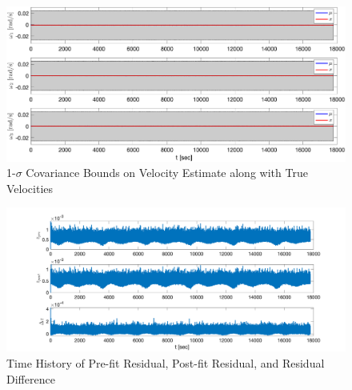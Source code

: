 \begin{figure}[H]
    \centering
    \captionsetup{ justification = centering}
    \includegraphics[width=12cm]{Images/PS10/mult_ext_kalman_filter_omega_cov_bounds.png}
    \caption{1-$\sigma$ Covariance Bounds on Velocity Estimate along with True Velocities}
    \label{fig:velocity_error_bounds}
\end{figure}

\begin{figure}[H]
    \centering
    \captionsetup{ justification = centering}
    \includegraphics[width=12cm]{Images/PS10/mult_ext_kalman_filter_residual_comparison.png}
    \caption{Time History of Pre-fit Residual, Post-fit Residual, and Residual Difference}
    \label{fig:residual_norm_histories}
\end{figure}


